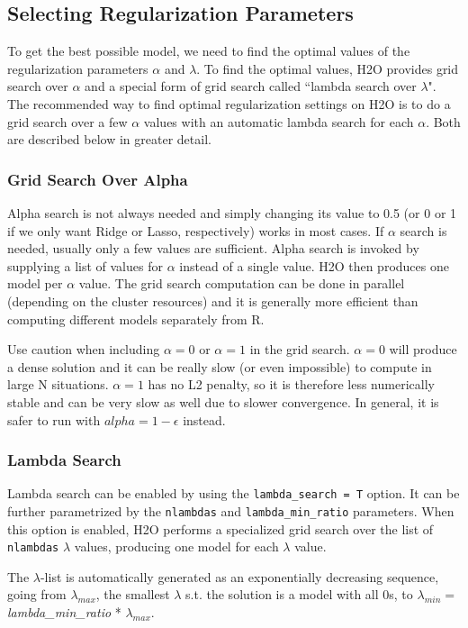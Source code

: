 \documentclass[11pt]{article}
\begin{document}
\subsection{Selecting Regularization Parameters}
To get the best possible model, we need to find the optimal values of the regularization parameters $\alpha$ and $\lambda$. 
To find the optimal values, H2O provides grid search over $\alpha$ and a special form of grid search called ``lambda search over $\lambda$". The recommended way to find optimal regularization settings on H2O is to do a grid search over a few $\alpha$ values with an automatic lambda search for each $\alpha$. Both are described below in greater detail. 
\subsubsection{Grid Search Over Alpha}
Alpha search is not always needed and simply changing its value to 0.5 (or 0 or 1 if we only want Ridge or Lasso, respectively) works in most cases. If $\alpha$ search is needed, usually only a few values are sufficient. Alpha search is invoked by supplying a list of values for $\alpha$ instead of a single value. H2O then produces one model per $\alpha$ value. The grid search computation can be done in parallel (depending on the cluster resources) and it is generally more efficient than computing different models separately from R. 

Use caution when including $\alpha=0$ or $\alpha=1$ in the grid search. $\alpha=0$ will produce a dense solution and it can be really slow (or even impossible) to compute in large N situations. $\alpha=1$ has no L2 penalty, so it is therefore less numerically stable and can be very slow as well due to slower convergence. In general, it is safer to run with $alpha=1-\epsilon$ instead.

\subsubsection{Lambda Search}  %
Lambda search can be enabled by using the \texttt{lambda\_search = T} option. It can be further parametrized by the \texttt{nlambdas} and \texttt{lambda\_min\_ratio} parameters. When this option is enabled, H2O performs a specialized grid search over the list of \texttt{nlambdas} $\lambda$ values, producing one model for each $\lambda$ value. 

The $\lambda$-list is automatically generated as an exponentially decreasing sequence, going from $\lambda_{max}$,
the smallest $\lambda$ s.t. the solution is a model with all 0s, to $\lambda_{min} = $ \textit{lambda\_min\_ratio} * $ \lambda_{max}$. %
\end{document}
